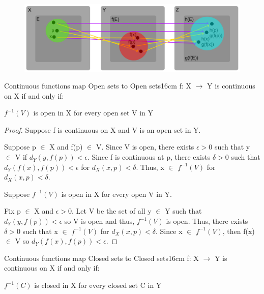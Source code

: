     \begin{figure}[h]
        \centering
        \includegraphics[scale=0.37]{Images/11.2.3.png}
    \end{figure}

    \newpage



    \begin{wtheorem}{Continuous functions map Open sets to Open sets}{16cm}
        f: X $\rightarrow$ Y is continuous on X if and only if:

        \hspace{0.5cm}
        $f^{-1}(V)$ is open in X for every open set V in Y
    \end{wtheorem}

    \begin{proof}
        Suppose f is continuous on X and V is an open set in Y.

        Suppose p $\in$ X and f(p) $\in$ V.
        Since V is open, there exists $\epsilon > 0$ such that
        y $\in$ V if $d_Y(y,f(p)) < \epsilon$.
        Since f is continuous at p, there exists $\delta > 0$ such that
        $d_Y(f(x),f(p)) < \epsilon$ for $d_X(x,p) < \delta$.
        Thus, x $\in$ $f^{-1}(V)$ for $d_X(x,p) < \delta$.

        \vspace{0.2cm}

        Suppose $f^{-1}(V)$ is open in X for every open V in Y.

        Fix p $\in$ X and $\epsilon > 0$.
        Let V be the set of all y $\in$ Y such that $d_Y(y,f(p)) < \epsilon$
        so V is open and thus, $f^{-1}(V)$ is open.
        Thus, there exists $\delta > 0$ such that x $\in$ $f^{-1}(V)$
        for $d_X(x,p) < \delta$.
        Since x $\in$ $f^{-1}(V)$, then f(x) $\in$ V
        so $d_Y(f(x),f(p)) < \epsilon$.
    \end{proof}

    \vspace{0.5cm}



    \begin{corollary}{Continuous functions map Closed sets to Closed sets}{16cm}
        f: X $\rightarrow$ Y is continuous on X if and only if:

        \hspace{0.5cm}
        $f^{-1}(C)$ is closed in X for every closed set C in Y   
    \end{corollary}

